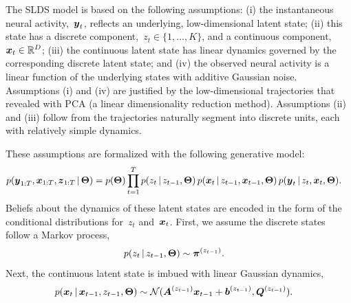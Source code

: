 \documentclass{article}
\begin{document}
The SLDS model is based on the following assumptions: (i) the instantaneous
neural activity,~$\boldsymbol{y}_t$, reflects an underlying, low-dimensional
latent state; (ii) this state has a discrete component,~$z_t \in \{1, \ldots, K\}$,
and a continuous component,~$\boldsymbol{x}_t \in \mathbb{R}^D$; (iii) the continuous
latent state has linear dynamics governed by the corresponding discrete
latent state; and (iv) the observed neural activity is a linear function
of the underlying states with additive Gaussian noise.  Assumptions (i)
and (iv) are justified by the low-dimensional trajectories that
\citet{kato2015global} revealed with PCA (a linear dimensionality
reduction method). Assumptions (ii) and (iii) follow from the
trajectories naturally segment into discrete units, each with relatively
simple dynamics. 

These assumptions are formalized with the following generative model:
\begin{align}
  \label{eq:joint}
  p(\boldsymbol{y}_{1:T}, \boldsymbol{x}_{1:T}, \boldsymbol{z}_{1:T} \,|\, \boldsymbol{\Theta}) &= 
  p(\boldsymbol{\Theta})
  \prod_{t=1}^T
  p(z_t \,|\, z_{t-1}, \boldsymbol{\Theta}) \, 
  p(\boldsymbol{x}_t \,|\, z_{t-1}, \boldsymbol{x}_{t-1}, \boldsymbol{\Theta}) \, 
  p(\boldsymbol{y}_t \,|\, z_t, \boldsymbol{x}_t, \boldsymbol{\Theta}).
\end{align}
Beliefs about the dynamics of these latent states are encoded in the 
form of the conditional distributions for~$z_t$ and~$\boldsymbol{x}_t$. First,
we assume the discrete states follow a Markov process,
\begin{align}
  p(z_t \,|\, z_{t-1}, \boldsymbol{\Theta}) &\sim \boldsymbol{\pi}^{(z_{t-1})}.
\end{align}
Next, the continuous latent state is imbued with linear Gaussian dynamics,
\begin{align}
  p(\boldsymbol{x}_t \,|\, \boldsymbol{x}_{t-1}, z_{t-1}, \boldsymbol{\Theta}) 
  &\sim \mathcal{N}(\boldsymbol{A}^{(z_{t-1})} \boldsymbol{x}_{t-1} + \boldsymbol{b}^{(z_{t-1})}, \boldsymbol{Q}^{(z_{t-1})}).
\end{align}
\end{document}
